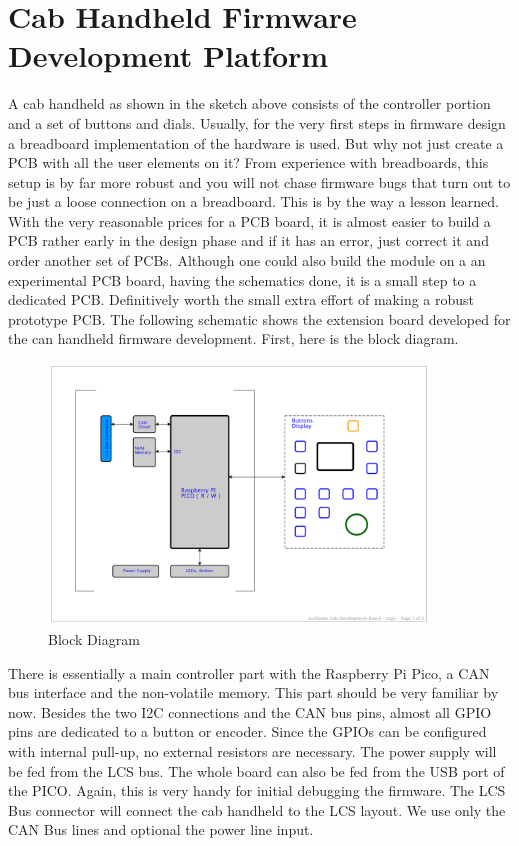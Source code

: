 \section{Cab Handheld Firmware Development Platform}

A cab handheld as shown in the sketch above consists of the controller portion and a set of buttons and dials. Usually, for the very first steps in firmware design a breadboard implementation of the hardware is used. But why not just create a PCB with all the user elements on it? From experience with breadboards, this setup is by far more robust and you will not chase firmware bugs that turn out to be just a loose connection on a breadboard. This is by the way a lesson learned. With the very reasonable prices for a PCB board, it is almost easier to build a PCB rather early in the design phase and if it has an error, just correct it and order another set of PCBs. Although one could also build the module on a an experimental PCB board, having the schematics done, it is a small step to a dedicated PCB. Definitively worth the small extra effort of making a robust prototype PCB. The following schematic shows the extension board developed for the can handheld firmware development. First, here is the block diagram.

\begin{figure}[ht]
    \centering
    \includegraphics[page=1, width=0.9\textwidth]{./Schematics/Schematic_LcsNodes-Cab-Dev.pdf}
    \caption{Block Diagram}
\end{figure}

There is essentially a main controller part with the Raspberry Pi Pico, a CAN bus interface and the non-volatile memory. This part should be very familiar by now. Besides the two I2C connections and the CAN bus pins, almost all GPIO pins are dedicated to a button or encoder. Since the GPIOs can be configured with internal pull-up, no external resistors are necessary. The power supply will be fed from the LCS bus. The whole board can also be fed from the USB port of the PICO. Again, this is very handy for initial debugging the firmware. The LCS Bus connector will connect the cab handheld to the LCS layout. We use only the CAN Bus lines and optional the power line input.

